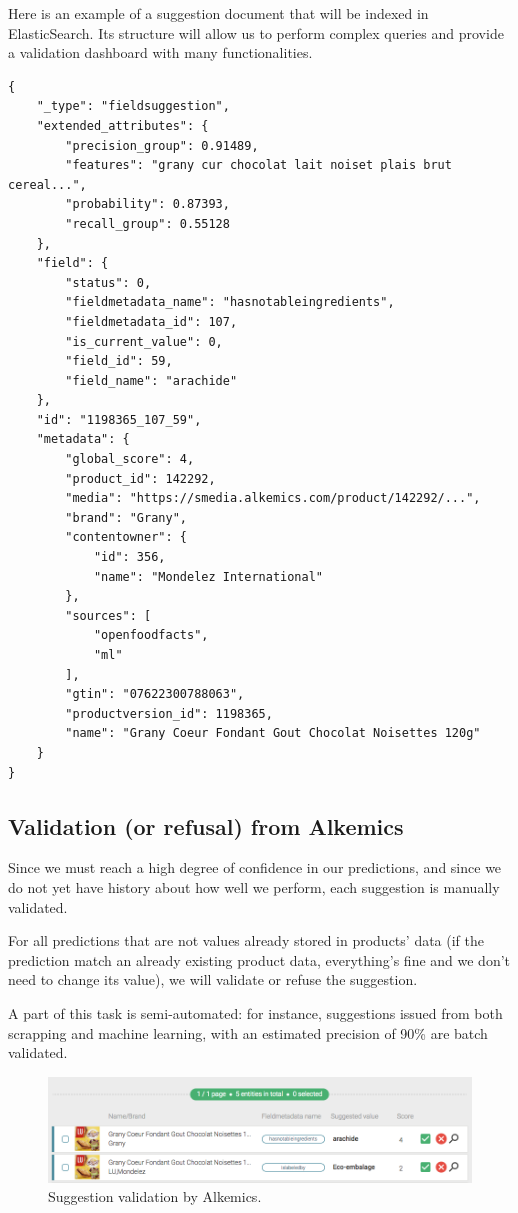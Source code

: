 Here is an example of a suggestion document that will be indexed in ElasticSearch. Its structure will allow us to perform complex queries and provide a validation dashboard with many functionalities.
\begin{verbatim}
{
    "_type": "fieldsuggestion",
    "extended_attributes": {
        "precision_group": 0.91489,
        "features": "grany cur chocolat lait noiset plais brut cereal...",
        "probability": 0.87393,
        "recall_group": 0.55128
    },
    "field": {
        "status": 0,
        "fieldmetadata_name": "hasnotableingredients",
        "fieldmetadata_id": 107,
        "is_current_value": 0,
        "field_id": 59,
        "field_name": "arachide"
    },
    "id": "1198365_107_59",
    "metadata": {
        "global_score": 4,
        "product_id": 142292,
        "media": "https://smedia.alkemics.com/product/142292/...",
        "brand": "Grany",
        "contentowner": {
            "id": 356,
            "name": "Mondelez International"
        },
        "sources": [
            "openfoodfacts",
            "ml"
        ],
        "gtin": "07622300788063",
        "productversion_id": 1198365,
        "name": "Grany Coeur Fondant Gout Chocolat Noisettes 120g"
    }
}
\end{verbatim}


\subsection{Validation (or refusal) from Alkemics}
Since we must reach a high degree of confidence in our predictions, and since we do not yet have history about how well we perform, each suggestion is manually validated. 


For all predictions that are not values already stored in products' data (if the prediction match an already existing product data, everything's fine and we don't need to change its value), we will validate or refuse the suggestion.

A part of this task is semi-automated: for instance, suggestions issued from both scrapping and machine learning, with an estimated precision of 90\% are batch validated.

\begin{figure}[H]
\centering
\includegraphics[scale=0.40]{./images/workflow/validation-suggestion.png}
\caption{Suggestion validation by Alkemics.}
\end{figure}


